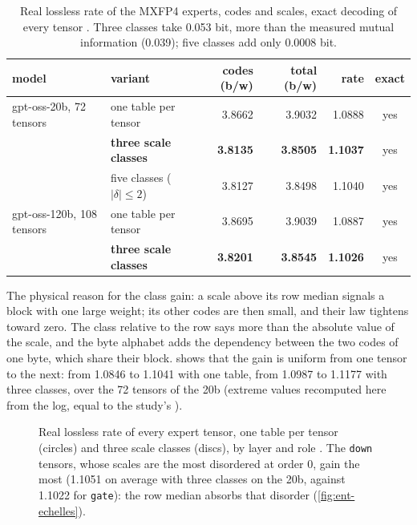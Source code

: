 \begin{table}[ht]
\centering\small
\caption[Real lossless rate of MXFP4, exact decoding]{Real lossless rate of the MXFP4 experts, codes and scales, exact decoding of every tensor \mes. Three classes take 0.053 bit, more than the measured mutual information (0.039); five classes add only 0.0008 bit.}
\label{tab:ent-taux}
\begin{tabular}{@{}llrrrc@{}}
\toprule
model & variant & codes (b/w) & total (b/w) & rate & exact \\
\midrule
gpt-oss-20b, 72 tensors & one table per tensor & 3.8662 & 3.9032 & 1.0888 & yes \\
 & \textbf{three scale classes} & \textbf{3.8135} & \textbf{3.8505} & \textbf{1.1037} & yes \\
 & five classes ($|\delta| \le 2$) & 3.8127 & 3.8498 & 1.1040 & yes \\
gpt-oss-120b, 108 tensors & one table per tensor & 3.8695 & 3.9039 & 1.0887 & yes \\
 & \textbf{three scale classes} & \textbf{3.8201} & \textbf{3.8545} & \textbf{1.1026} & yes \\
\bottomrule
\end{tabular}
\end{table}

The physical reason for the class gain: a scale above its row median signals a block with one large weight; its other codes are then small, and their law tightens toward zero. The class relative to the row says more than the absolute value of the scale, and the byte alphabet adds the dependency between the two codes of one byte, which share their block.  shows that the gain is uniform from one tensor to the next: from 1.0846 to 1.1041 with one table, from 1.0987 to 1.1177 with three classes, over the 72 tensors of the 20b (extreme values recomputed here from the log, equal to the study's \calc).

\begin{figure}[ht]
\centering
\GrapheTauxTenseurs
\caption[Real lossless rate of every expert tensor]{Real lossless rate of every expert tensor, one table per tensor (circles) and three scale classes (discs), by layer and role \mes. The \texttt{down} tensors, whose scales are the most disordered at order 0, gain the most (1.1051 on average with three classes on the 20b, against 1.1022 for \texttt{gate}): the row median absorbs that disorder (\cref{fig:ent-echelles}).}
\label{fig:ent-taux}
\end{figure}

